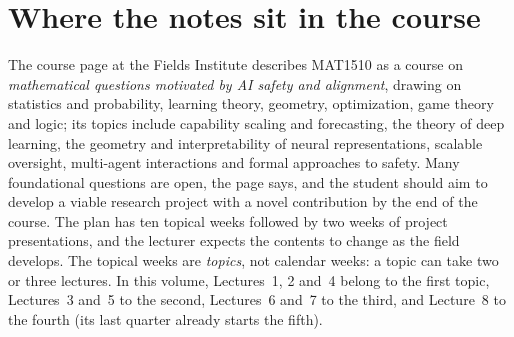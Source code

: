 \clearpage
{\hypersetup{linkcolor=ink}\tableofcontents}

\clearpage
\chapter*{Where the notes sit in the course}

The course page at the Fields Institute describes MAT1510 as a course on \emph{mathematical questions motivated by AI safety and alignment}, drawing on statistics and
probability, learning theory, geometry, optimization, game theory and logic; its topics include capability scaling and forecasting, the theory of deep learning, the geometry and interpretability of neural representations,
scalable oversight, multi-agent interactions and formal approaches to safety. Many foundational questions are open, the page says, and the student should aim to develop a viable research project with a novel contribution by the end of the course. The plan
has ten topical weeks followed by two weeks of project presentations, and the lecturer expects the contents to change as the field develops. The topical weeks are \emph{topics}, not calendar weeks: a topic can take two or three lectures.
In this volume, Lectures~1, 2 and~4 belong to the first topic, Lectures~3 and~5 to the second, Lectures~6 and~7 to the third, and Lecture~8 to the fourth (its last quarter already starts the fifth).


